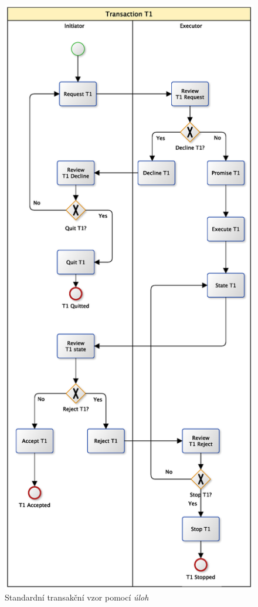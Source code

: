 \begin{figure}[htbp]
\centering
\includegraphics[width=\textwidth,height=\textheight,keepaspectratio]{obrazky/transaction-standard-tasks}
\caption{Standardní transakční vzor pomocí \textit{úloh}}
\label{fig:St_trans_ulohy}
\end{figure}


